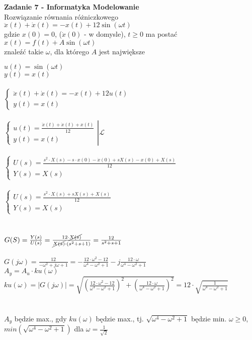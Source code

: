 \documentclass[a4paper,11pt]{article}
\begin{document}
\newpage
\begin{framed}
\textbf{Zadanie 7 - Informatyka Modelowanie } \\ 
Rozwiązanie równania różniczkowego\\
	$\ddot{x}(t)+\dot{x}(t)=-x(t)+12\sin({\omega t})$\\
	gdzie $x(0)=0$, ($\dot{x}(0)$ - w domysle), $t \geq 0$ ma postać\\
	$x(t)=f(t)+A\sin({\omega t})$\\
znaleźć takie $\omega$, dla którego $A$ jest największe\\
\end{framed}
$u(t)=\sin({\omega t})$\\
$y(t)=x(t)$\\\\
$\begin{cases} \ddot{x}(t)+\dot{x}(t)=-x(t)+12u(t)\\y(t)=x(t)\end{cases}$\\\\
$\left.\begin{cases} u(t)=\frac{\ddot{x}(t)+\dot{x}(t)+x(t)}{12}\\y(t)=x(t)\end{cases}\right|\mathscr{L}$\\\\
$\begin{cases} U(s)=\frac{s^2\cdot X(s)-s\cdot x(0)-\dot{x}(0)+sX(s)-x(0)+X(s)}{12}\\Y(s)=X(s)\end{cases}$\\\\
$\begin{cases} U(s)=\frac{s^2\cdot X(s)+sX(s)+X(s)}{12}\\Y(s)=X(s)\end{cases}$\\\\\\
$G(S)=\frac{Y(s)}{U(s)}=\frac{12\cdot \cancel{X(s)}}{\cancel{X(s)}\cdot (s^2+s+1)}=\frac{12}{s^2+s+1}$\\\\
$G(j\omega)=\frac{12}{-\omega^2+j\omega+1}=-\frac{12\cdot \omega^2-12}{\omega^4-\omega^2+1}-j\frac{12\cdot \omega}{\omega^4-\omega^2+1}$\\
$A_y=A_u\cdot ku(\omega)$\\
$ku(\omega)=|G(j\omega)|=\sqrt{\left(\frac{12\cdot \omega^2-12}{\omega^4-\omega^2+1}\right)^2+\left(\frac{12\cdot \omega}{\omega^4-\omega^2+1}\right)^2}=12\cdot \sqrt{\frac{1}{\omega^4-\omega^2+1}}$\\\\\\
$A_y$ będzie max., gdy $ku(\omega)$ będzie max., tj. $\sqrt{\omega^4-\omega^2+1}$ będzie min.
$\omega \geq 0$, $min(\sqrt{\omega^4-\omega^2+1})$ dla $\omega=\frac{1}{\sqrt{2}}$
\end{document}
